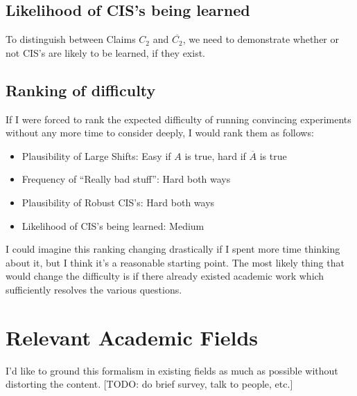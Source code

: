\documentclass{article}
\begin{document}
\subsection{Likelihood of CIS's being learned}
To distinguish between Claims $C_2$ and $\overline{C_2}$, we need to demonstrate whether or not CIS's are likely to be learned, if they exist.
\subsection{Ranking of difficulty}
If I were forced to rank the expected difficulty of running convincing experiments without any more time to consider deeply, I would rank them as follows:
\begin{itemize}
    \item Plausibility of Large Shifts: Easy if $A$ is true, hard if $\overline{A}$ is true
    \item Frequency of ``Really bad stuff”: Hard both ways
    \item Plausibility of Robust CIS's: Hard both ways
    \item Likelihood of CIS's being learned: Medium
\end{itemize}
I could imagine this ranking changing drastically if I spent more time thinking about it, but I think it’s a reasonable starting point. The most likely thing that would change the difficulty is if there already existed academic work which sufficiently resolves the various questions. 
\section{Relevant Academic Fields}
I'd like to ground this formalism in existing fields as much as possible without distorting the content. [TODO: do brief survey, talk to people, etc.]
\end{document}

